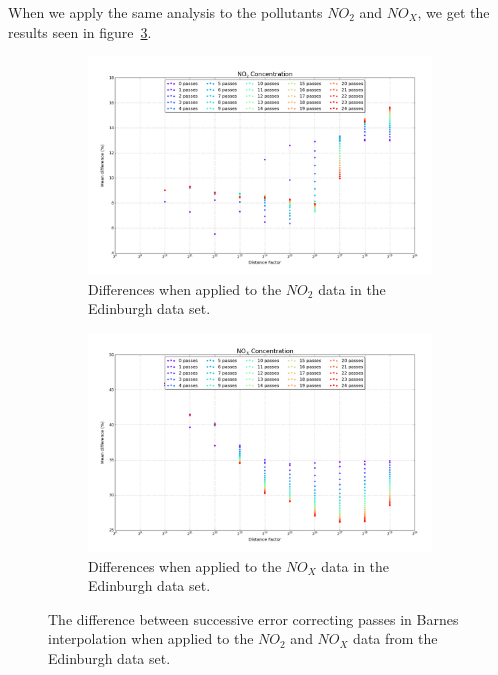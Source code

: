         	When we apply the same analysis to the pollutants $NO_{2}$ and $NO_{X}$, we get the results seen in figure~\ref{fig:barnes_distance_factor_results_NO2_NOx}. 

        	\begin{figure}[H]
                \centering
                \begin{subfigure}{\textwidth}
                    \centering
                    \includegraphics[width=\linewidth]{./images/Barnes_Distance_Factor_NO2.png}
                    \caption{Differences when applied to the $NO_{2}$ data in the Edinburgh data set.}
                    \label{fig:barnes_distance_factor_results_NO2}
                \end{subfigure}
                \begin{subfigure}{\textwidth}
                    \includegraphics[width=\linewidth]{./images/Barnes_Distance_Factor_NOx.png}
                    \caption{Differences when applied to the $NO_{X}$ data in the Edinburgh data set.}
                    \label{fig:barnes_distance_factor_results_NOx}
                \end{subfigure}
                \caption{The difference between successive error correcting passes in Barnes interpolation when applied to the $NO_{2}$ and $NO_{X}$ data from the Edinburgh data set.}
                \label{fig:barnes_distance_factor_results_NO2_NOx}
            \end{figure}


